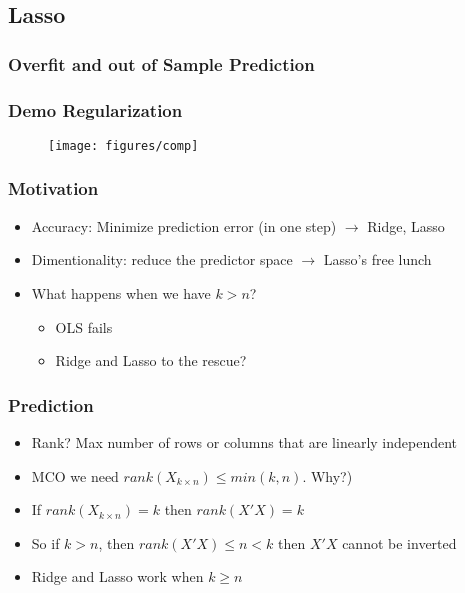 \documentclass[
  shownotes,
  xcolor={svgnames},
  hyperref={colorlinks,citecolor=DarkBlue,linkcolor=DarkRed,urlcolor=DarkBlue}
  , aspectratio=169]{beamer}
\begin{document}
\subsection{Lasso}
\begin{frame}[fragile]
\frametitle{Overfit and out of Sample Prediction}

\frametitle{Demo Regularization}

   \begin{figure}[H] \centering
            \captionsetup{justification=centering}
              \texttt{[image: figures/comp]}
 \end{figure}


\end{frame}
\begin{frame}[fragile]
\frametitle{Motivation}

\begin{itemize}
  \item Accuracy: Minimize prediction error (in one step) $\rightarrow$ Ridge, Lasso
  \item Dimentionality: reduce the predictor space $\rightarrow$ Lasso's free lunch
\end{itemize}
\bigskip
\begin{itemize}
  \item What happens when we have $k>n$?
  \begin{itemize}
   \item OLS fails
   \item Ridge and Lasso to the rescue?
  \end{itemize}
\end{itemize}

\end{frame}

\begin{frame}[fragile]
\frametitle{Prediction}

\begin{itemize}
  \item Rank? Max number of rows or columns that are linearly independent
  \item MCO we need $rank(X_{k\times n}) \leq min(k,n)$. Why?)
  \item If $rank(X_{k\times n})=k$ then $rank(X'X)=k$
  \item So if $k>n$, then  $rank(X'X)\leq n < k$ then $X'X$ cannot be inverted
  \item Ridge and Lasso work when $k \geq n$
\end{itemize}

\end{frame}
\end{document}
